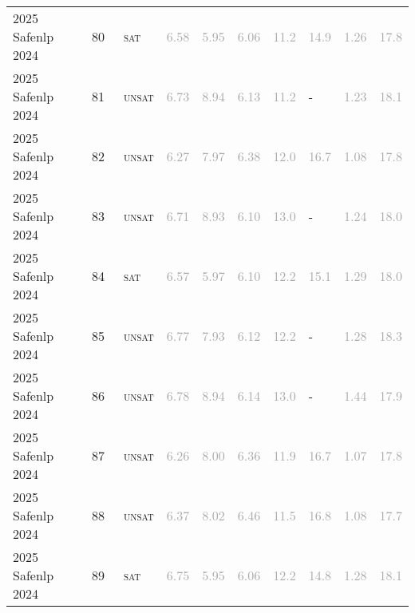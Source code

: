 \begin{center}
{\begin{longtable}{@{}llllllllll@{}}
2025 Safenlp 2024 & 80 & ~\textsc{sat} & \textcolor{darkgray}{6.58} & \textcolor{darkgray}{5.95} & \textcolor{darkgray}{6.06} & \textcolor{darkgray}{11.2} & \textcolor{darkgray}{14.9} & \textcolor{darkgray}{1.26} & \textcolor{darkgray}{17.8} \\
2025 Safenlp 2024 & 81 & ~\textsc{unsat} & \textcolor{darkgray}{6.73} & \textcolor{darkgray}{8.94} & \textcolor{darkgray}{6.13} & \textcolor{darkgray}{11.2} & - & \textcolor{darkgray}{1.23} & \textcolor{darkgray}{18.1} \\
2025 Safenlp 2024 & 82 & ~\textsc{unsat} & \textcolor{darkgray}{6.27} & \textcolor{darkgray}{7.97} & \textcolor{darkgray}{6.38} & \textcolor{darkgray}{12.0} & \textcolor{darkgray}{16.7} & \textcolor{darkgray}{1.08} & \textcolor{darkgray}{17.8} \\
2025 Safenlp 2024 & 83 & ~\textsc{unsat} & \textcolor{darkgray}{6.71} & \textcolor{darkgray}{8.93} & \textcolor{darkgray}{6.10} & \textcolor{darkgray}{13.0} & - & \textcolor{darkgray}{1.24} & \textcolor{darkgray}{18.0} \\
2025 Safenlp 2024 & 84 & ~\textsc{sat} & \textcolor{darkgray}{6.57} & \textcolor{darkgray}{5.97} & \textcolor{darkgray}{6.10} & \textcolor{darkgray}{12.2} & \textcolor{darkgray}{15.1} & \textcolor{darkgray}{1.29} & \textcolor{darkgray}{18.0} \\
2025 Safenlp 2024 & 85 & ~\textsc{unsat} & \textcolor{darkgray}{6.77} & \textcolor{darkgray}{7.93} & \textcolor{darkgray}{6.12} & \textcolor{darkgray}{12.2} & - & \textcolor{darkgray}{1.28} & \textcolor{darkgray}{18.3} \\
2025 Safenlp 2024 & 86 & ~\textsc{unsat} & \textcolor{darkgray}{6.78} & \textcolor{darkgray}{8.94} & \textcolor{darkgray}{6.14} & \textcolor{darkgray}{13.0} & - & \textcolor{darkgray}{1.44} & \textcolor{darkgray}{17.9} \\
2025 Safenlp 2024 & 87 & ~\textsc{unsat} & \textcolor{darkgray}{6.26} & \textcolor{darkgray}{8.00} & \textcolor{darkgray}{6.36} & \textcolor{darkgray}{11.9} & \textcolor{darkgray}{16.7} & \textcolor{darkgray}{1.07} & \textcolor{darkgray}{17.8} \\
2025 Safenlp 2024 & 88 & ~\textsc{unsat} & \textcolor{darkgray}{6.37} & \textcolor{darkgray}{8.02} & \textcolor{darkgray}{6.46} & \textcolor{darkgray}{11.5} & \textcolor{darkgray}{16.8} & \textcolor{darkgray}{1.08} & \textcolor{darkgray}{17.7} \\
2025 Safenlp 2024 & 89 & ~\textsc{sat} & \textcolor{darkgray}{6.75} & \textcolor{darkgray}{5.95} & \textcolor{darkgray}{6.06} & \textcolor{darkgray}{12.2} & \textcolor{darkgray}{14.8} & \textcolor{darkgray}{1.28} & \textcolor{darkgray}{18.1} \\

\end{longtable}}
\end{center}

